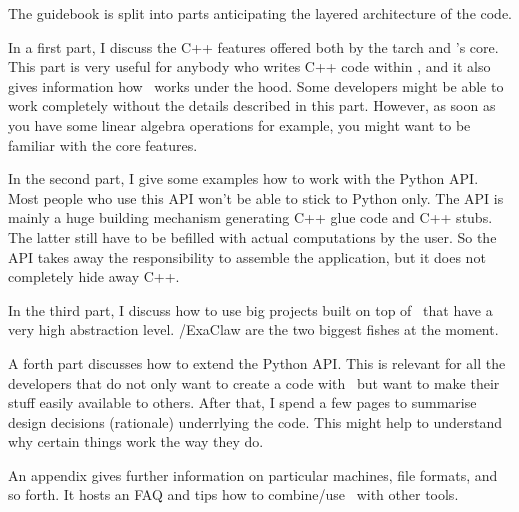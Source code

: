 The guidebook is split into parts anticipating the layered architecture of the
code.

In a first part, I discuss the C++ features offered both by the
tarch and \Peano's core.
This part is very useful for anybody who writes C++ code within \Peano, and it
also gives information how \Peano\ works under the hood. 
Some developers might be able to work completely without the details described
in this part.
However, as soon as you have some linear algebra operations for example, you
might want to be familiar with the core features.


In the second part, I give some examples how to work with the Python API. 
Most people who use this API won't be able to stick to Python only.
The API is mainly a huge building mechanism generating C++ glue code and C++
stubs.
The latter still have to be befilled with actual computations by the user.
So the API takes away the responsibility to assemble the application, but it
does not completely hide away C++.


In the third part, I discuss how to use big projects built on top of
\Peano\ that have a very high abstraction level.
\ExaHyPE/ExaClaw are the two biggest fishes at the moment.


A forth part discusses how to extend the Python API. 
This is relevant for all the developers that do not only want to create a code
with \Peano\ but want to make their stuff easily available to others.
After that, I spend a few pages to summarise design decisions (rationale)
underrlying the code.
This might help to understand why certain things work the way they do.


An appendix gives further information on particular machines, file formats, and
so forth. 
It hosts an FAQ and tips how to combine/use \Peano\ with other tools.
